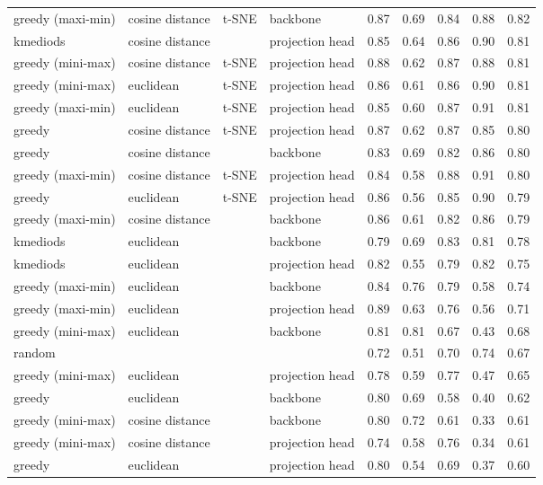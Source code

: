 \documentclass{article}
\begin{document}
\begin{table*}[tp]
\begin{tabular}{llll|rrrr|r}
  greedy (maxi-min) & cosine distance & t-SNE & backbone & 0.87 & 0.69 & 0.84 & 0.88 & 0.82 \\ 
  kmediods & cosine distance &  & projection head & 0.85 & 0.64 & 0.86 & 0.90 & 0.81 \\ 
  greedy (mini-max) & cosine distance & t-SNE & projection head & 0.88 & 0.62 & 0.87 & 0.88 & 0.81 \\ 
  greedy (mini-max) & euclidean & t-SNE & projection head & 0.86 & 0.61 & 0.86 & 0.90 & 0.81 \\ 
  greedy (maxi-min) & euclidean & t-SNE & projection head & 0.85 & 0.60 & 0.87 & 0.91 & 0.81 \\ 
  greedy & cosine distance & t-SNE & projection head & 0.87 & 0.62 & 0.87 & 0.85 & 0.80 \\ 
  greedy & cosine distance &  & backbone & 0.83 & 0.69 & 0.82 & 0.86 & 0.80 \\ 
  greedy (maxi-min) & cosine distance & t-SNE & projection head & 0.84 & 0.58 & 0.88 & 0.91 & 0.80 \\ 
  greedy & euclidean & t-SNE & projection head & 0.86 & 0.56 & 0.85 & 0.90 & 0.79 \\ 
  greedy (maxi-min) & cosine distance &  & backbone & 0.86 & 0.61 & 0.82 & 0.86 & 0.79 \\ 
  kmediods & euclidean &  & backbone & 0.79 & 0.69 & 0.83 & 0.81 & 0.78 \\ 
  kmediods & euclidean &  & projection head & 0.82 & 0.55 & 0.79 & 0.82 & 0.75 \\ 
  greedy (maxi-min) & euclidean &  & backbone & 0.84 & 0.76 & 0.79 & 0.58 & 0.74 \\ 
  greedy (maxi-min) & euclidean &  & projection head & 0.89 & 0.63 & 0.76 & 0.56 & 0.71 \\ 
  greedy (mini-max) & euclidean &  & backbone & 0.81 & 0.81 & 0.67 & 0.43 & 0.68 \\ 
  random &  &  &  & 0.72 & 0.51 & 0.70 & 0.74 & 0.67 \\ 
  greedy (mini-max) & euclidean &  & projection head & 0.78 & 0.59 & 0.77 & 0.47 & 0.65 \\ 
  greedy & euclidean &  & backbone & 0.80 & 0.69 & 0.58 & 0.40 & 0.62 \\ 
  greedy (mini-max) & cosine distance &  & backbone & 0.80 & 0.72 & 0.61 & 0.33 & 0.61 \\ 
  greedy (mini-max) & cosine distance &  & projection head & 0.74 & 0.58 & 0.76 & 0.34 & 0.61 \\ 
  greedy & euclidean &  & projection head & 0.80 & 0.54 & 0.69 & 0.37 & 0.60 \\ 
   \hline
\end{tabular}
 \normalsize
\end{table*}
\end{document}
